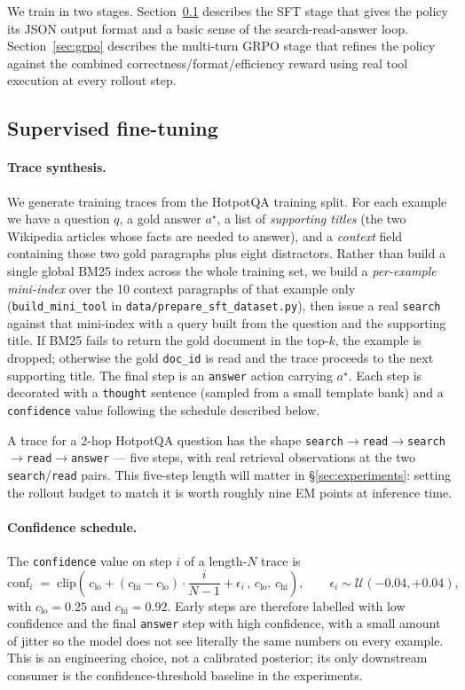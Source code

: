 \documentclass[11pt]{article}
\begin{document}
We train in two stages. Section~\ref{sec:sft} describes the SFT stage
that gives the policy its JSON output format and a basic sense of the
search-read-answer loop. Section~\ref{sec:grpo} describes the
multi-turn GRPO stage that refines the policy against the combined
correctness/format/efficiency reward using real tool execution at every
rollout step.

\subsection{Supervised fine-tuning}
\label{sec:sft}

\paragraph{Trace synthesis.}
We generate training traces from the HotpotQA training split. For each
example we have a question $q$, a gold answer $a^\star$, a list of
\emph{supporting titles} (the two Wikipedia articles whose facts are
needed to answer), and a \emph{context} field containing those two gold
paragraphs plus eight distractors. Rather than build a single global
BM25 index across the whole training set, we build a \emph{per-example
mini-index} over the 10 context paragraphs of that example only
(\texttt{build\_mini\_tool} in
\texttt{data/prepare\_sft\_dataset.py}), then issue a real
\texttt{search} against that mini-index with a query built from the
question and the supporting title. If BM25 fails to return the gold
document in the top-$k$, the example is dropped; otherwise the gold
\texttt{doc\_id} is read and the trace proceeds to the next supporting
title. The final step is an \texttt{answer} action carrying $a^\star$.
Each step is decorated with a \texttt{thought} sentence (sampled from a
small template bank) and a \texttt{confidence} value following the
schedule described below.

A trace for a 2-hop HotpotQA question has the shape
\texttt{search}$\to$\texttt{read}$\to$\texttt{search}$\to$\texttt{read}$\to$\texttt{answer}
--- five steps, with real retrieval observations at the two
\texttt{search}/\texttt{read} pairs. This five-step length will matter
in §\ref{sec:experiments}: setting the rollout budget to match it is
worth roughly nine EM points at inference time.

\paragraph{Confidence schedule.}
The \texttt{confidence} value on step $i$ of a length-$N$ trace is
\[
  \mathrm{conf}_i \;=\;
  \mathrm{clip}\!\left(\,
  c_\mathrm{lo} + (c_\mathrm{hi} - c_\mathrm{lo}) \cdot \frac{i}{N-1}
  + \epsilon_i \,,\, c_\mathrm{lo},\, c_\mathrm{hi}\right),
\qquad
  \epsilon_i \sim \mathcal{U}(-0.04, +0.04),
\]
with $c_\mathrm{lo}=0.25$ and $c_\mathrm{hi}=0.92$. Early steps are
therefore labelled with low confidence and the final \texttt{answer}
step with high confidence, with a small amount of jitter so the model
does not see literally the same numbers on every example. This is an
engineering choice, not a calibrated posterior; its only downstream
consumer is the confidence-threshold baseline in the experiments.
\end{document}
